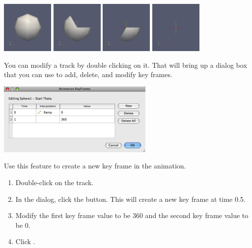 \begin{inlinefig}
  \includegraphics[width=1in]{images/AnimateSphere0}
  \includegraphics[width=1in]{images/AnimateSphere1}
  \includegraphics[width=1in]{images/AnimateSphere2}
  \includegraphics[width=1in]{images/AnimateSphere3}
\end{inlinefig}

You can modify a track by double clicking on it.  That will bring up a
dialog box that you can use to add, delete, and modify key frames.

\begin{inlinefig}
  \includegraphics[width=3in]{images/AnimationKeyframesDialog}
\end{inlinefig}

Use this feature to create a new key frame in the animation.

\begin{enumerate}
  \restorecounter
\item Double-click on the  track.
\item In the  dialog, click the  button.
  This will create a new key frame at time 0.5.
\item Modify the first key frame value to be 360 and the second key frame
  value to be 0.
\item Click .
\end{enumerate}

